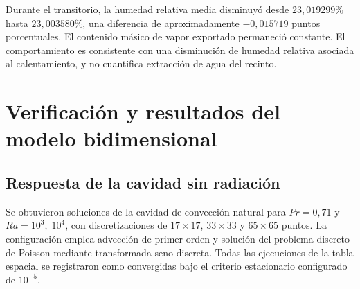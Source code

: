 Durante el transitorio, la humedad relativa media disminuyó desde $23{,}019299\%$ hasta $23{,}003580\%$, una diferencia de aproximadamente $-0{,}015719$ puntos porcentuales. El contenido másico de vapor exportado permaneció constante. El comportamiento es consistente con una disminución de humedad relativa asociada al calentamiento, y no cuantifica extracción de agua del recinto.




\FloatBarrier

\section{Verificación y resultados del modelo bidimensional}
\label{res:cavidad}

\subsection{Respuesta de la cavidad sin radiación}

Se obtuvieron soluciones de la cavidad de convección natural para $Pr=0{,}71$ y $Ra=10^3,\;10^4$, con discretizaciones de $17\times17$, $33\times33$ y $65\times65$ puntos. La configuración emplea advección de primer orden y solución del problema discreto de Poisson mediante transformada seno discreta. Todas las ejecuciones de la tabla espacial se registraron como convergidas bajo el criterio estacionario configurado de $10^{-5}$.

